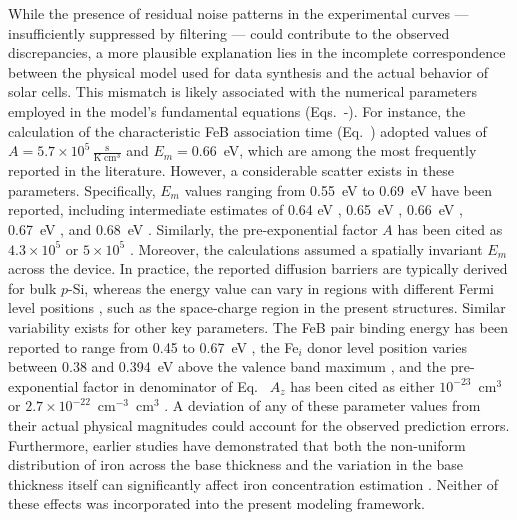 \documentclass[10pt]{iopart}
\begin{document}
While the presence of residual noise patterns in the experimental curves ---
insufficiently suppressed by filtering --- could contribute to the observed discrepancies,
a more plausible explanation lies in the incomplete correspondence between the physical model used for data synthesis and the actual behavior of solar cells.
This mismatch is likely associated with the numerical parameters employed in the model’s fundamental equations (Eqs.~-).
For instance, the calculation of the characteristic FeB association time (Eq.~) adopted values of
$A=5.7\times10^5\,\frac{\mathrm{s}}{\mathrm{K}\;\mathrm{cm}^3}$ and $E_m=0.66$~eV, which are among the most frequently reported in the literature.
However, a considerable scatter exists in these parameters.
Specifically, $E_m$ values ranging from 0.55~eV \cite{Lauer2016} to 0.69~eV \cite{FeBStrongIll} have been reported,
including intermediate estimates of 0.64 eV \cite{Zhu2011}, 0.65~eV \cite{KimerlingFeB},
0.66~eV \cite{FeBAssSST2011, Le2024, FeBKin2019, FeBJAP2005},
0.67~eV \cite{Zhu2015}, and 0.68~eV \cite{Wijaranakula, Macdonald2004, Zoth1990}.
Similarly, the pre-exponential factor $A$ has been cited as $4.3\times10^5$ \cite{FeBLight2} or $5\times10^5$ \cite{FeBJAP2005, FeBkinAPL2008}.
Moreover, the calculations assumed a spatially invariant $E_m$ across the device.
In practice, the reported diffusion barriers are typically derived for bulk $p$-Si,
whereas the energy value can vary in regions with different Fermi level positions \cite{Murphy2014}, such as the space-charge region in the present structures.
Similar variability exists for other key parameters.
The FeB pair binding energy has been reported to range from 0.45 to 0.67~eV \cite{KimerlingFeB, Zhu2015, Wijaranakula, Hayamizu1991},
the Fe$_i$ donor level position varies between 0.38 and 0.394~eV above the valence band maximum \cite{FeBAssJAP2014, Macdonald2004, FeB:Schmidt, Narland},
and the pre-exponential factor in denominator of Eq.~ $A_z$ has been cited as either
$10^{-23}$~cm$^{3}$ or $2.7\times10^{-22}$~cm$^{-3}$~cm$^{3}$ \cite{Zhu2015}.
A deviation of any of these parameter values from their actual physical magnitudes could account for the observed prediction errors.
Furthermore, earlier studies have demonstrated that both the non-uniform distribution of iron across the base thickness
and the variation in the base thickness itself can significantly affect iron concentration estimation \cite{KimerlingFeB}.
Neither of these effects was incorporated into the present modeling framework.
\end{document}
